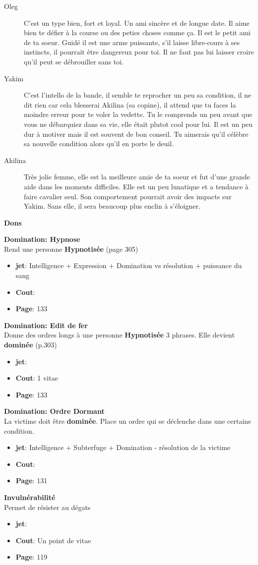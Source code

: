 \documentclass[oneside,12pt]{book}
\newcommand\don[5]{
\textbf{#1} \\
#2
\begin{itemize}
\item{ \textbf{jet}: #3}
\item{ \textbf{Cout}: #4}
\item{ \textbf{Page}: #5}
\end{itemize}
\vspace{0.5cm}
}
\begin{document}
\begin{flushleft}
\begin{description}
{}
\end{description}
\begin{description}
\item[Oleg]{C'est un type bien, fort et loyal. Un ami sincère et de longue date. Il aime bien te défier à la course ou des peties choses comme ça. Il est le petit ami de ta soeur. Guidé il est une arme puissante, s'il laisse libre-cours à ses instincts, il pourrait être dangereux pour toi. Il ne faut pas lui laisser croire qu'il peut se débrouiller sans toi.}
\item[Yakim]{C'est l'intello de la bande, il semble te reprocher un peu sa condition, il ne dit rien car cela blesserai Akilina (sa copine), il attend que tu faces la moindre erreur pour te voler la vedette. Tu le comprends un peu avant que vous ne débarquiez dans sa vie, elle était plutot cool pour lui. Il est un peu dur à motiver mais il est souvent de bon conseil. Tu aimerais qu'il célèbre sa nouvelle condition alors qu'il en porte le deuil. }
\item[Akilina]{Très jolie femme, elle est la meilleure amie de ta soeur et fut d'une grande aide dans les moments difficiles. Elle est un peu lunatique et a tendance à faire cavalier seul. Son comportement pourrait avoir des impacts sur Yakim. Sans elle, il sera beaucoup plus enclin à s'éloigner.}
\end{description}
 
\clearpage
\textbf{\large Dons}
\vspace{0.5cm}


\don{Domination: Hypnose}{Rend une personne \textbf{Hypnotisée} (page 305)}{Intelligence + Expression + Domination vs résolution + puissance du sang}{}{133}
\don{Domination: Edit de fer}{Donne des ordres longs à une personne \textbf{Hypnotisée} 3 phrases. Elle devient \textbf{dominée} (p.303)}{}{1 vitae}{133}
\don{Domination: Ordre Dormant}{La victime doit être \textbf{dominée}. Place un ordre qui se déclenche dans une certaine condition.}{Intelligence + Subterfuge + Domination - résolution de la victime}{}{131}
\don{Invulnérabilité}{Permet de résister au dégats}{}{Un point de vitae}{119}

\clearpage


\end{flushleft}
\end{document}
